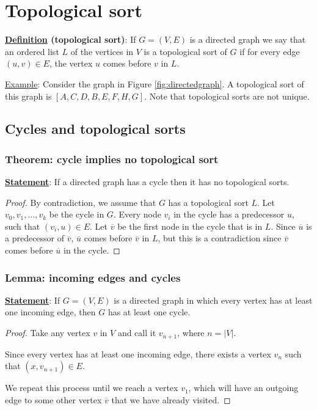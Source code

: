 \documentclass[12pt]{extarticle}
\begin{document}
\section{Topological sort}

\textbf{\underline{Definition} (topological sort)}: If $G = (V, E)$ is a directed graph we say that an ordered list $L$ of the vertices in $V$ is a topological sort of $G$ if for every edge $(u, v) \in E$, the vertex $u$ comes before $v$ in $L$.

\underline{Example}: Consider the graph in Figure \ref{fig:directedgraph}. A topological sort of this graph is $[A, C, D, B, E, F, H, G]$.
Note that topological sorts are not unique.


\subsection{Cycles and topological sorts}

\subsubsection{Theorem: cycle implies no topological sort}

\textbf{\underline{Statement}}: If a directed graph has a cycle then it has no topological sorts.

\begin{proof}
    By contradiction, we assume that $G$ has a topological sort $L$.
    Let $v_0, v_1, \dots, v_k$ be the cycle in $G$.
    Every node $v_i$ in the cycle has a predecessor $u$, such that $(v_i, u) \in E$.
    Let $\overline{v}$ be the first node in the cycle that is in $L$.
    Since $\overline {u}$ is a predecessor of $\overline{v}$, $\overline{u}$ comes before $\overline{v}$ in $L$,
    but this is a contradiction since $\overline{v}$ comes before $\overline{u}$ in the cycle.
\end{proof}

\subsubsection{Lemma: incoming edges and cycles}

\textbf{\underline{Statement}}: If $G = (V, E)$ is a directed graph in which every vertex has at least one incoming edge, then $G$ has at least one cycle.

\begin{proof}
    Take any vertex $v$ in $V$ and call it $v_{n+1}$, where $n = |V|$.

    Since every vertex has at least one incoming edge, there exists a vertex $v_n$ such that $(x, v_{n+1}) \in E$.

    We repeat this process until we reach a vertex $v_1$, which will have an outgoing edge to some other vertex $\overline{v}$ that we have already visited.
\end{proof}
\end{document}
